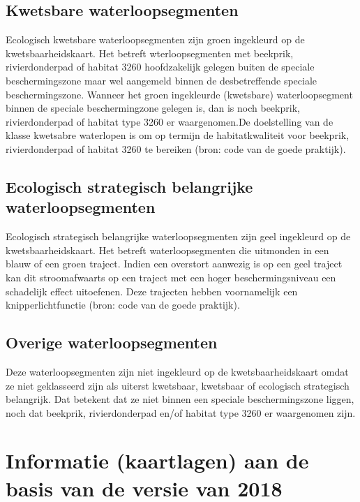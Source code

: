 \documentclass[twoside]{extreport}
\begin{document}
\subsection{Kwetsbare
waterloopsegmenten}\label{kwetsbare-waterloopsegmenten}

Ecologisch kwetsbare waterloopsegmenten zijn groen ingekleurd op de
kwetsbaarheidskaart. Het betreft wterloopsegmenten met beekprik,
rivierdonderpad of habitat 3260 hoofdzakelijk gelegen buiten de speciale
beschermingszone maar wel aangemeld binnen de desbetreffende speciale
beschermingszone. Wanneer het groen ingekleurde (kwetsbare)
waterloopsegment binnen de speciale beschermingzone gelegen is, dan is
noch beekprik, rivierdonderpad of habitat type 3260 er waargenomen.De
doelstelling van de klasse kwetsabre waterlopen is om op termijn de
habitatkwaliteit voor beekprik, rivierdonderpad of habitat 3260 te
bereiken (bron: code van de goede praktijk).

\subsection{Ecologisch strategisch belangrijke
waterloopsegmenten}\label{ecologisch-strategisch-belangrijke-waterloopsegmenten}

Ecologisch strategisch belangrijke waterloopsegmenten zijn geel
ingekleurd op de kwetsbaarheidskaart. Het betreft waterloopsegmenten die
uitmonden in een blauw of een groen traject. Indien een overstort
aanwezig is op een geel traject kan dit stroomafwaarts op een traject
met een hoger beschermingsniveau een schadelijk effect uitoefenen. Deze
trajecten hebben voornamelijk een knipperlichtfunctie (bron: code van de
goede praktijk).

\subsection{Overige
waterloopsegmenten}\label{overige-waterloopsegmenten}

Deze waterloopsegmenten zijn niet ingekleurd op de kwetsbaarheidskaart
omdat ze niet geklasseerd zijn als uiterst kwetsbaar, kwetsbaar of
ecologisch strategisch belangrijk. Dat betekent dat ze niet binnen een
speciale beschermingszone liggen, noch dat beekprik, rivierdonderpad
en/of habitat type 3260 er waargenomen zijn.

\section{Informatie (kaartlagen) aan de basis van de versie van
2018}\label{informatie-kaartlagen-aan-de-basis-van-de-versie-van-2018}
\end{document}
